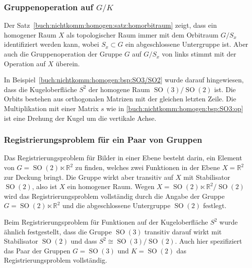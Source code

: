 %
%
\subsubsection{Gruppenoperation auf $G/K$
\label{buch:nichtkomm:homogen:subsection:opaufgk}}
Der Satz~\ref{buch:nichtkomm:homogen:satz:homorbitraum} zeigt, dass
ein homogener Raum $X$ als topologischer Raum immer mit dem Orbitraum
$G/S_x$ identifiziert werden kann, wobei $S_x\subset G$ ein abgeschlossene
Untergruppe ist.
Aber auch die Gruppenoperation der Gruppe $G$ auf $G/S_x$ von links
stimmt mit der Operation auf $X$ überein.

\begin{beispiel}
In Beispiel~\ref{buch:nichtkomm:homogen:bsp:SO3/SO2} wurde darauf
hingewiesen, dass die Kugeloberfläche $S^2$ der homogene Raum
$\operatorname{SO}(3)/\operatorname{SO}(2)$ ist.
Die Orbits bestehen aus orthogonalen Matrizen mit der gleichen letzten
Zeile.
Die Multiplikation mit einer Matrix $s$ wie in 
\eqref{buch:nichtkomm:homogen:bsp:SO3:op}
ist eine Drehung der Kugel um die vertikale Achse.
\end{beispiel}

%
%
\subsubsection{Registrierungsproblem für ein Paar von Gruppen}
Das Registrierungsproblem für Bilder in einer Ebene besteht
darin, ein Element von $G=\operatorname{SO}(2)\ltimes \mathbb{R}^2$
zu finden, welches zwei Funktionen in der Ebene $X=\mathbb{R}^2$
zur Deckung bringt.
Die Gruppe wirkt aber transitiv auf $X$ mit Stabilisator
$\operatorname{SO}(2)$, also ist $X$ ein homogener Raum.
Wegen $X=\operatorname{SO}(2)\ltimes\mathbb{R}^2/\operatorname{SO}(2)$
wird das Registrierungsproblem vollständig durch die Angabe
der Gruppe $G=\operatorname{SO}(2)\ltimes \mathbb{R}^2$ und
die abgeschlossene Untergruppe $\operatorname{SO}(2)$ festlegt.

Beim Registrierungsproblem für Funktionen auf der Kugeloberfläche
$S^2$ wurde ähnlich festgestellt, dass die Gruppe $\operatorname{SO}(3)$
transitiv darauf wirkt mit Stabilisator $\operatorname{SO}(2)$ und
dass $S^2\cong \operatorname{SO}(3)/\operatorname{SO}(2)$.
Auch hier spezifiziert das Paar der Gruppen $G=\operatorname{SO}(3)$
und $K=\operatorname{SO}(2)$ das Registrierungsproblem vollständig.



